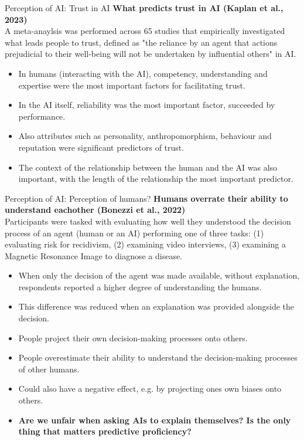 \documentclass[8pt]{beamer}
\begin{document}
	\begin{frame}[t]{Perception of AI: Trust in AI}
		\textbf{What predicts trust in AI (Kaplan et al., 2023)}\\
		A meta-anaylsis was performed across 65 studies that empirically investigated what leads people to trust, defined as "the reliance by an agent that actions prejudicial to their well-being will not be undertaken by influential others" in AI.
		\begin{itemize}
			\item In humans (interacting with the AI), competency, understanding and expertise were the most important factors for facilitating trust.
			\item In the AI itself, reliability was the most important factor, succeeded by performance.
			\item Also attributes such as personality, anthropomorphism, behaviour and reputation were significant predictors of trust.
			\item The context of the relationship between the human and the AI was also important, with the length of the relationship the most important predictor.
		\end{itemize}
	\end{frame}

	\begin{frame}[t]{Perception of AI: Perception of humans?}
		\textbf{Humans overrate their ability to understand eachother (Bonezzi et al., 2022)}\\
		Participants were tasked with evaluating how well they understood the decision process of an agent (human or an AI) performing one of three tasks: (1) evaluating risk for recidivism, (2) examining video interviews, (3) examining a Magnetic Resonance Image to diagnose a disease.
		\begin{itemize}
			\item When only the decision of the agent was made available, without explanation, respondents reported a higher degree of understanding the humans.
			\item This difference was reduced when an explanation was provided alongside the decision.
			\item People project their own decision-making processes onto others.
			\item People overestimate their ability to understand the decision-making processes of other humans.
			\item Could also have a negative effect, e.g. by projecting ones own biases onto others.
			\item \textbf{Are we unfair when asking AIs to explain themselves? Is the only thing that matters predictive proficiency?}
		\end{itemize}
	\end{frame}
\end{document}
